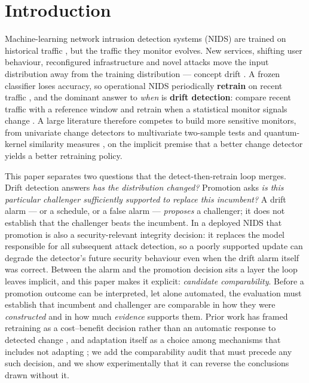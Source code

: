 \documentclass[journal]{IEEEtran}
\begin{document}
\section{Introduction}


Machine-learning network intrusion detection systems (NIDS) are trained on historical traffic \cite{nguyen2023tsids}, but the traffic they monitor evolves. New services, shifting user behaviour, reconfigured infrastructure and novel attacks move the input distribution away from the training distribution --- concept drift \cite{shyaa2024evolving,wahab2022intrusion,roshan2018adaptive}. A frozen classifier loses accuracy, so operational NIDS periodically \textbf{retrain} on recent traffic \cite{wahab2022intrusion,camarda2025managing,constantinides2019novel}, and the dominant answer to \emph{when} is \textbf{drift detection}: compare recent traffic with a reference window and retrain when a statistical monitor signals change \cite{gama2004learning,rabanser2019failing,lukats2024benchmark}. A large literature therefore competes to build more sensitive monitors, from univariate change detectors to multivariate two-sample tests \cite{gretton2012kernel,szekely2013energy} and quantum-kernel similarity measures \cite{havlicek2019supervised,schuld2019quantum,kaissar2026enhancing}, on the implicit premise that a better change detector yields a better retraining policy.


This paper separates two questions that the detect-then-retrain loop merges. Drift detection answers \emph{has the distribution changed?} Promotion asks \emph{is this particular challenger sufficiently supported to replace this incumbent?} A drift alarm --- or a schedule, or a false alarm --- \emph{proposes} a challenger; it does not establish that the challenger beats the incumbent. In a deployed NIDS that promotion is also a security-relevant integrity decision: it replaces the model responsible for all subsequent attack detection, so a poorly supported update can degrade the detector's future security behaviour even when the drift alarm itself was correct. Between the alarm and the promotion decision sits a layer the loop leaves implicit, and this paper makes it explicit: \emph{candidate comparability}. Before a promotion outcome can be interpreted, let alone automated, the evaluation must establish that incumbent and challenger are comparable in how they were \emph{constructed} and in how much \emph{evidence} supports them. Prior work has framed retraining as a cost--benefit decision rather than an automatic response to detected change \cite{zliobaite2015cost,mahadevan2024cost,regol2025retrain}, and adaptation itself as a choice among mechanisms that includes not adapting \cite{bakirov2021automated}; we add the comparability audit that must precede any such decision, and we show experimentally that it can reverse the conclusions drawn without it.
\end{document}
